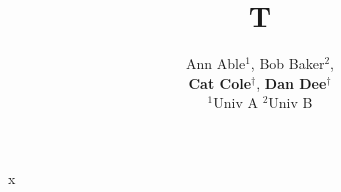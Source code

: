 \documentclass{article}
\title{T}
\author{Ann Able$^{1}$, Bob Baker$^{2}$,\\ \textbf{Cat Cole}$^{\dagger}$, \textbf{Dan Dee}$^{\dagger}$\\ $^{1}$Univ A \quad $^{2}$Univ B}
\begin{document}
\maketitle
x
\end{document}
